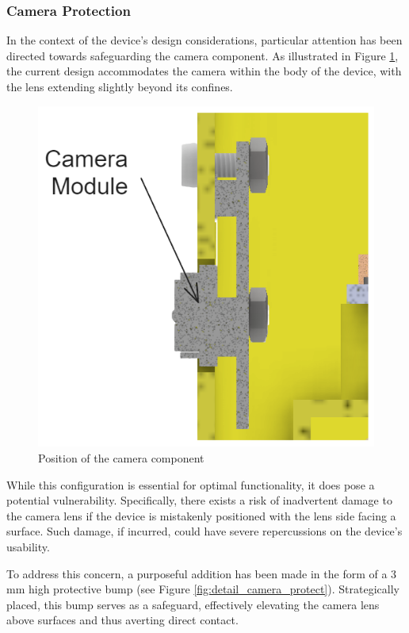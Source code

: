 \subsubsection{Camera Protection}

In the context of the device's design considerations, particular attention has been directed towards safeguarding the camera component. As illustrated in Figure \ref{fig:camera_position}, the current design accommodates the camera within the body of the device, with the lens extending slightly beyond its confines.

\begin{figure}[h!]
    \centering
    \includegraphics[height=5 cm]{texs/Part1/chapter4/image/d1.png}
    \caption{Position of the camera component}
    \label{fig:camera_position}
\end{figure}

While this configuration is essential for optimal functionality, it does pose a potential vulnerability. Specifically, there exists a risk of inadvertent damage to the camera lens if the device is mistakenly positioned with the lens side facing a surface. Such damage, if incurred, could have severe repercussions on the device's usability.

To address this concern, a purposeful addition has been made in the form of a 3 mm high protective bump (see Figure \ref{fig:detail_camera_protect}). Strategically placed, this bump serves as a safeguard, effectively elevating the camera lens above surfaces and thus averting direct contact.

